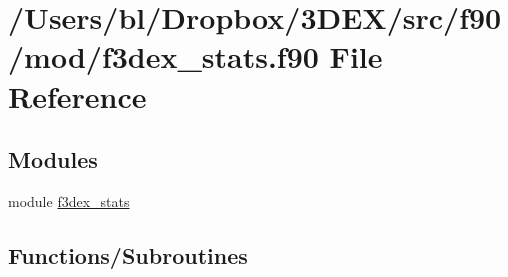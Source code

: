 \hypertarget{f3dex__stats_8f90}{
\section{/Users/bl/Dropbox/3DEX/src/f90/mod/f3dex\_\-stats.f90 File Reference}
\label{f3dex__stats_8f90}
}
\subsection*{Modules}
\begin{DoxyCompactItemize}
\item 
module \hyperlink{namespacef3dex__stats}{f3dex\_\-stats}
\end{DoxyCompactItemize}
\subsection*{Functions/Subroutines}
